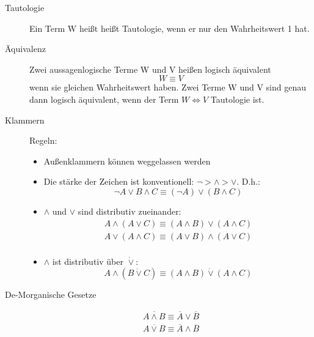 \begin{description}
    \item[Tautologie] Ein Term W heißt heißt Tautologie, wenn er nur den Wahrheitswert 1 hat.
    \item[Äquivalenz] Zwei aussagenlogische Terme W und V heißen logisch äquivalent \[W \equiv V\] wenn sie gleichen Wahrheitswert haben. Zwei Terme W und V sind genau dann logisch äquivalent, wenn der Term $W\Leftrightarrow V$ Tautologie ist.
    \item[Klammern] Regeln:
    \begin{itemize}
        \item Außenklammern können weggelassen werden
        \item Die stärke der Zeichen ist konventionell: $\neg > \wedge > \vee$. D.h.:
        \[\neg A \vee B \wedge C \equiv (\neg A) \vee (B \wedge C)\]
        \item $\wedge$ und $\vee$ sind distributiv zueinander:
        \begin{gather*}
            A \wedge (A \vee C) \equiv (A \wedge B) \vee (A \wedge C)\\
            A \vee (A \wedge C) \equiv (A \vee B) \wedge (A \vee C)\\
        \end{gather*}
        \item $\wedge$ ist distributiv über $\dot{\vee}$:
        \[A \wedge (B \dot{\vee} C) \equiv (A \wedge B) \dot{\vee} (A \wedge C)\]
    \end{itemize}
    \item[De-Morganische Gesetze] \begin{gather*}
                                      \overline{A \wedge B} \equiv \overline{A} \vee \overline{B}\\
                                      \overline{A \vee B} \equiv \overline{A} \wedge \overline{B}\\
    \end{gather*}
\end{description}
